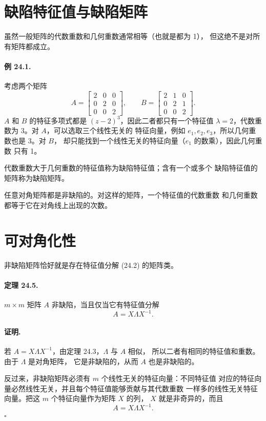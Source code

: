 \documentclass[UTF8,fontset=none,12pt]{ctexart}
\begin{document}
\section*{缺陷特征值与缺陷矩阵}

虽然一般矩阵的代数重数和几何重数通常相等（也就是都为 1），
但这绝不是对所有矩阵都成立。

\paragraph{例 24.1.}
考虑两个矩阵
\[
A=
\begin{bmatrix}
2&0&0\\
0&2&0\\
0&0&2
\end{bmatrix},
\qquad
B=
\begin{bmatrix}
2&1&0\\
0&2&1\\
0&0&2
\end{bmatrix}.
\]
$A$ 和 $B$ 的特征多项式都是 $(z-2)^3$，因此二者都只有一个特征值
$\lambda=2$，代数重数为 3。对 $A$，可以选取三个线性无关的
特征向量，例如 $e_1,e_2,e_3$，所以几何重数也是 3。对 $B$，
却只能找到一个线性无关的特征向量（$e_1$ 的数乘），因此几何重数
只有 1。

代数重数大于几何重数的特征值称为缺陷特征值；含有一个或多个
缺陷特征值的矩阵称为缺陷矩阵。

任意对角矩阵都是非缺陷的。对这样的矩阵，一个特征值的代数重数
和几何重数都等于它在对角线上出现的次数。

\section*{可对角化性}

非缺陷矩阵恰好就是存在特征值分解 (24.2) 的矩阵类。

\paragraph{定理 24.5.}
$m\times m$ 矩阵 $A$ 非缺陷，当且仅当它有特征值分解
\[
A=X\Lambda X^{-1}.
\]

\paragraph{证明.}
若 $A=X\Lambda X^{-1}$，由定理 24.3，$\Lambda$ 与 $A$ 相似，
所以二者有相同的特征值和重数。由于 $\Lambda$ 是对角矩阵，
它是非缺陷的，从而 $A$ 也是非缺陷的。

反过来，非缺陷矩阵必须有 $m$ 个线性无关的特征向量：不同特征值
对应的特征向量必然线性无关，并且每个特征值能够贡献与其代数重数
一样多的线性无关特征向量。把这 $m$ 个特征向量作为矩阵 $X$ 的列，
$X$ 就是非奇异的，而且
\[
A=X\Lambda X^{-1}.
\]
\hfill$\square$
\end{document}
